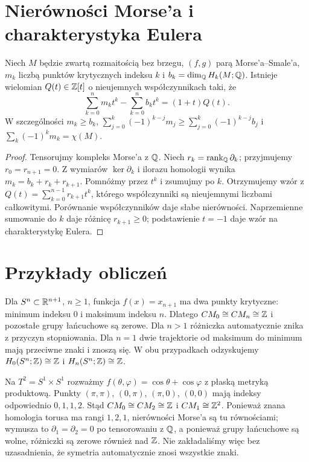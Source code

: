 \section{Nierówności Morse'a i charakterystyka Eulera}
\begin{twierdzenie}
\label{thm:morse-inequalities-v10}
Niech $M$ będzie zwartą rozmaitością bez brzegu, $(f,g)$
parą Morse'a--Smale'a, $m_k$ liczbą punktów krytycznych
indeksu $k$ i $b_k=\dim_{\mathbb{Q}} H_k(M;\mathbb{Q})$.
Istnieje wielomian $Q(t)\in\mathbb{Z}[t]$ o nieujemnych współczynnikach taki, że
\[
\sum_{k=0}^{n}m_kt^k-\sum_{k=0}^{n}b_kt^k=(1+t)Q(t).
\]
W szczególności $m_k\ge b_k$,
$\sum_{j=0}^k(-1)^{k-j}m_j\ge
\sum_{j=0}^k(-1)^{k-j}b_j$ i
$\sum_k(-1)^km_k=\chi(M)$.
\end{twierdzenie}
\begin{proof}
Tensorujmy kompleks Morse'a z $\mathbb{Q}$. Niech
$r_k=\operatorname{rank}_{\mathbb{Q}}\partial_k$; przyjmujemy $r_0=r_{n+1}=0$.
Z wymiarów $\ker\partial_k$ i ilorazu homologii wynika
$m_k=b_k+r_k+r_{k+1}$. Pomnóżmy przez $t^k$
i zsumujmy po $k$. Otrzymujemy wzór z
$Q(t)=\sum_{k=0}^{n-1}r_{k+1}t^k$, którego współczynniki
są nieujemnymi liczbami całkowitymi.
Porównanie współczynników daje słabe nierówności.
Naprzemienne sumowanie do $k$ daje różnicę $r_{k+1}\ge0$;
podstawienie $t=-1$ daje wzór na charakterystykę Eulera.
\end{proof}

\section{Przykłady obliczeń}
\begin{przyklad}
Dla $S^n\subset\mathbb{R}^{n+1}$, $n\ge1$, funkcja
$f(x)=x_{n+1}$ ma dwa punkty krytyczne: minimum indeksu $0$
i maksimum indeksu $n$. Dlatego $CM_0\cong CM_n\cong\mathbb{Z}$
i pozostałe grupy łańcuchowe są zerowe.
Dla $n>1$ różniczka automatycznie znika z przyczyn
stopniowania. Dla $n=1$ dwie trajektorie od maksimum
do minimum mają przeciwne znaki i znoszą się.
W obu przypadkach odzyskujemy $H_0(S^n;\mathbb{Z})\cong\mathbb{Z}$
i $H_n(S^n;\mathbb{Z})\cong\mathbb{Z}$.
\end{przyklad}

\begin{przyklad}
Na $T^2=S^1\times S^1$ rozważmy
$f(\theta,\varphi)=\cos\theta+\cos\varphi$
z płaską metryką produktową. Punkty $(\pi,\pi)$,
$(0,\pi)$, $(\pi,0)$, $(0,0)$ mają indeksy odpowiednio
$0,1,1,2$. Stąd $CM_0\cong CM_2\cong\mathbb{Z}$ i $CM_1\cong\mathbb{Z}^2$.
Ponieważ znana homologia torusa ma rangi $1,2,1$,
nierówności Morse'a są tu równościami; wymusza to
$\partial_1=\partial_2=0$ po tensorowaniu z $\mathbb{Q}$,
a ponieważ grupy łańcuchowe są wolne, różniczki są zerowe
również nad $\mathbb{Z}$. Nie zakładaliśmy więc bez uzasadnienia,
że symetria automatycznie znosi wszystkie znaki.
\end{przyklad}

